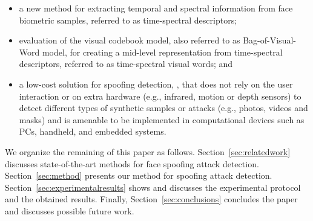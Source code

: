 %
\begin{itemize}
	\item a new method for extracting temporal and spectral information from face biometric samples, referred to as time-spectral descriptors;
	\item evaluation of the visual codebook model, also referred to as Bag-of-Visual-Word model, for creating a mid-level representation from time-spectral descriptors, referred to as time-spectral visual words; and
	\item a low-cost solution for spoofing detection, , that does not rely on the user interaction or on extra hardware (e.g., infrared, motion or depth sensors) to detect different types of synthetic samples or attacks (e.g., photos, videos and masks) and is amenable to be implemented in computational devices such as PCs, handheld, and embedded systems. 
\end{itemize}

We organize the remaining of this paper as follows. Section~\ref{sec:relatedwork} discusses state-of-the-art methods for face spoofing attack detection. Section~\ref{sec:method} presents our method for spoofing attack detection. Section~\ref{sec:experimentalresults} shows and discusses the experimental protocol and the obtained results. Finally, Section~\ref{sec:conclusions} concludes the paper and discusses possible future work.
